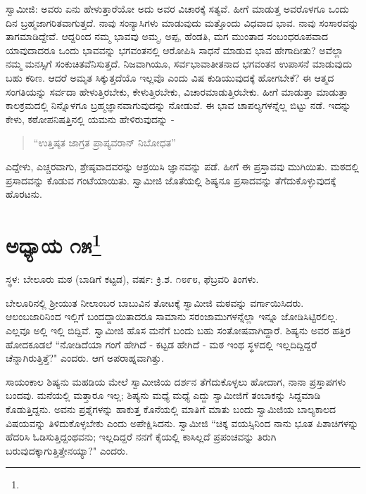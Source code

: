 ಸ್ವಾಮೀಜಿ: ಅವರು ಏನು ಹೇಳುತ್ತಾರೆಯೋ ಅದು ಅವರ ವಿಚಾರಕ್ಕೆ ಸತ್ಯವೆ. ಹೀಗೆ ಮಾಡುತ್ತ ಅವರೊಳಗೂ ಒಂದು ದಿನ ಬ್ರಹ್ಮಜಾಗರಿತವಾಗುತ್ತದೆ. ನಾವು ಸಂನ್ಯಾಸಿಗಳು ಮಾಡುವುದು ಮತ್ತೊಂದು ವಿಧವಾದ ಭಾವ. ನಾವು ಸಂಸಾರವನ್ನು ತಾಗಮಾಡಿದ್ದೇವೆ. ಆದ್ದರಿಂದ ನಮ್ಮ ಭಾವವು ಅಮ್ಮ, ಅಪ್ಪ, ಹೆಂಡತಿ, ಮಗ ಮುಂತಾದ ಸಂಬಂಧರೂಪವಾದ ಯಾವುದಾದರೂ ಒಂದು ಭಾವವನ್ನು ಭಗವಂತನಲ್ಲಿ ಆರೋಪಿಸಿ ಸಾಧನೆ ಮಾಡುವ ಭಾವ ಹೇಗಾದೀತು? ಅವೆಲ್ಲಾ ನಮ್ಮ ಮನಸ್ಸಿಗೆ ಸಂಕುಚಿತವೆನಿಸುತ್ತದೆ. ನಿಜವಾಗಿಯೂ, ಸರ್ವಭಾವಾತೀತನಾದ ಭಗವಂತನ ಉಪಾಸನೆ ಮಾಡುವುದು ಬಹು ಕಠಿಣ. ಆದರೆ ಅಮೃತ ಸಿಕ್ಕುತ್ತದೆಯೊ ಇಲ್ಲವೊ ಎಂದು ವಿಷ ಕುಡಿಯುವುದಕ್ಕೆ ಹೋಗಬೇಕೆ? ಈ ಆತ್ಮದ ಸಂಗತಿಯನ್ನು ಸರ್ವದಾ ಹೇಳುತ್ತಿರಬೇಕು, ಕೇಳುತ್ತಿರಬೇಕು, ವಿಚಾರಮಾಡುತ್ತಿರಬೇಕು. ಹೀಗೆ ಮಾಡುತ್ತಾ ಮಾಡುತ್ತಾ ಕಾಲಕ್ರಮದಲ್ಲಿ ನಿನ್ನೊಳಗೂ ಬ್ರಹ್ಮಜ್ಞಾನವಾಗುವುದನ್ನು ನೋಡುವೆ. ಈ ಭಾವ ಚಾಪಲ್ಯಗಳನ್ನೆಲ್ಲ ಬಿಟ್ಟು ನಡೆ. ಇದನ್ನು ಕೇಳು, ಕಠೋಪನಿಷತ್ತಿನಲ್ಲಿ ಯಮನು ಹೇಳಿರುವುದನ್ನು -

\begin{verse}
“ಉತ್ತಿಷ್ಠತ ಜಾಗ್ರತ ಪ್ರಾಪ್ಯವರಾನ್ ನಿಬೋಧತ”
\end{verse}

ಎದ್ದೇಳು, ಎಚ್ಚರವಾಗು, ಶ್ರೇಷ್ಠವಾದವರನ್ನು ಆಶ್ರಯಿಸಿ ಜ್ಞಾನವನ್ನು ಪಡೆ. ಹೀಗೆ ಈ ಪ್ರಸ್ತಾವವು ಮುಗಿಯಿತು. ಮಠದಲ್ಲಿ ಪ್ರಸಾದವನ್ನು ಕೊಡುವ ಗಂಟೆಯಾಯಿತು. ಸ್ವಾಮೀಜಿ ಜೊತೆಯಲ್ಲಿ ಶಿಷ್ಯನೂ ಪ್ರಸಾದವನ್ನು ತೆಗೆದುಕೊಳ್ಳುವುದಕ್ಕೆ ಹೊರಟನು.

\newpage

\chapter[ಅಧ್ಯಾಯ ೧೫]{ಅಧ್ಯಾಯ ೧೫\protect\footnote{}}

\begin{center}
ಸ್ಥಳ: ಬೇಲೂರು ಮಠ (ಬಾಡಿಗೆ ಕಟ್ಟಡ), ವರ್ಷ: ಕ್ರಿ.ಶ. ೧೮೯೮, ಫೆಬ್ರವರಿ ತಿಂಗಳು.
\end{center}

ಬೇಲೂರಿನಲ್ಲಿ ಶ‍್ರೀಯುತ ನೀಲಾಂಬರ ಬಾಬುವಿನ ತೋಟಕ್ಕೆ ಸ್ವಾಮೀಜಿ ಮಠವನ್ನು ವರ್ಗಾಯಿಸಿದರು. ಆಲಂಬಜಾರಿನಿಂದ ಇಲ್ಲಿಗೆ ಬಂದದ್ದಾಯಿತಾದರೂ ಸಾಮಾನು ಸರಂಜಾಮುಗಳನ್ನೆಲ್ಲಾ ಇನ್ನೂ ಜೋಡಿಸಿಟ್ಟಿರಲಿಲ್ಲ. ಎಲ್ಲವೂ ಅಲ್ಲಿ ಇಲ್ಲಿ ಬಿದ್ದಿವೆ. ಸ್ವಾಮೀಜಿ ಹೊಸ ಮನೆಗೆ ಬಂದು ಬಹು ಸಂತೋಷವಾಗಿದ್ದಾರೆ. ಶಿಷ್ಯನು ಅವರ ಹತ್ತಿರ ಹೋದಕೂಡಲೆ “ನೋಡಿದೆಯಾ ಗಂಗೆ ಹೇಗಿದೆ - ಕಟ್ಟಡ ಹೇಗಿದೆ - ಮಠ ಇಂಥ ಸ್ಥಳದಲ್ಲಿ ಇಲ್ಲದಿದ್ದಿದ್ದರೆ ಚೆನ್ನಾಗಿರುತ್ತಿತ್ತೆ?" ಎಂದರು. ಆಗ ಅಪರಾಹ್ನವಾಗಿತ್ತು.

ಸಾಯಂಕಾಲ ಶಿಷ್ಯನು ಮಹಡಿಯ ಮೇಲೆ ಸ್ವಾಮೀಜಿಯ ದರ್ಶನ ತೆಗೆದುಕೊಳ್ಳಲು ಹೋದಾಗ, ನಾನಾ ಪ್ರಸ್ತಾಪಗಳು ಬಂದವು. ಮನೆಯಲ್ಲಿ ಮತ್ತಾರೂ ಇಲ್ಲ; ಶಿಷ್ಯನು ಮಧ್ಯೆ ಮಧ್ಯೆ ಎದ್ದು ಸ್ವಾಮೀಜಿಗೆ ತಂಬಾಕನ್ನು ಸಿದ್ದಮಾಡಿ ಕೊಡುತ್ತಿದ್ದನು. ಅವನು ಪ್ರಶ್ನೆಗಳನ್ನು ಹಾಕುತ್ತ ಕೊನೆಯಲ್ಲಿ ಮಾತಿಗೆ ಮಾತು ಬಂದು ಸ್ವಾಮಿಜಿಯ ಬಾಲ್ಯಕಾಲದ ವಿಷಯವನ್ನು ತಿಳಿದುಕೊಳ್ಳಬೇಕು ಎಂದು ಅಪೇಕ್ಷಿಸಿದನು. ಸ್ವಾಮೀಜಿ “ಚಿಕ್ಕ ವಯಸ್ಸಿನಿಂದ ನಾನು ಭೂತ ಪಿಶಾಚಿಗಳನ್ನು ಹೆದರಿಸಿ ಓಡಿಸುತ್ತಿದ್ದಂಥವನು; ಇಲ್ಲದಿದ್ದರೆ ನನಗೆ ಕೈಯಲ್ಲಿ ಕಾಸಿಲ್ಲದೆ ಪ್ರಪಂಚವನ್ನು ತಿರುಗಿ ಬರುವುದಕ್ಕಾಗುತ್ತಿತ್ತೇನಯ್ಯಾ?" ಎಂದರು.


